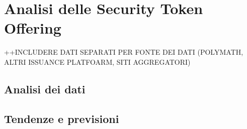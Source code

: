 \chapter{Analisi delle Security Token Offering}
++INCLUDERE DATI SEPARATI PER FONTE DEI DATI (POLYMATH, ALTRI ISSUANCE PLATFOARM, SITI AGGREGATORI)
\section{Analisi dei dati}

\section{Tendenze e previsioni}